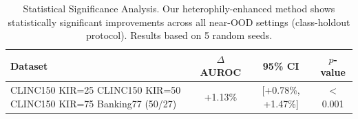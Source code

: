 \begin{table}[t]
\centering
\caption{Statistical Significance Analysis. Our heterophily-enhanced method shows statistically significant improvements across all near-OOD settings (class-holdout protocol). Results based on 5 random seeds.}
\label{tab:significance}
\begin{tabular}{lccc}
\toprule
\textbf{Dataset} & \textbf{$\Delta$ AUROC} & \textbf{95\% CI} & \textbf{$p$-value} \\
\midrule
CLINC150 KIR=25%
CLINC150 KIR=50%
CLINC150 KIR=75%
Banking77 (50/27) & +1.13\% & [+0.78\%, +1.47\%] & $<$0.001 \\
\bottomrule
\end{tabular}
\end{table}
